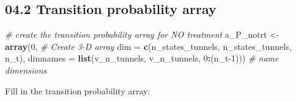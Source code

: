\documentclass[
]{article}
\newenvironment{Shaded}{\begin{snugshade}}{\end{snugshade}}
\newcommand{\CommentTok}[1]{\textcolor[rgb]{0.56,0.35,0.01}{\textit{#1}}}
\newcommand{\DataTypeTok}[1]{\textcolor[rgb]{0.13,0.29,0.53}{#1}}
\newcommand{\DecValTok}[1]{\textcolor[rgb]{0.00,0.00,0.81}{#1}}
\newcommand{\KeywordTok}[1]{\textcolor[rgb]{0.13,0.29,0.53}{\textbf{#1}}}
\newcommand{\NormalTok}[1]{#1}
\newcommand{\OperatorTok}[1]{\textcolor[rgb]{0.81,0.36,0.00}{\textbf{#1}}}
\newcommand{\StringTok}[1]{\textcolor[rgb]{0.31,0.60,0.02}{#1}}
\begin{document}
\hypertarget{transition-probability-array}{%
\subsection{04.2 Transition probability
array}\label{transition-probability-array}}

\begin{Shaded}
\begin{Highlighting}[]
\CommentTok{# create the transition probability array for NO treatment}
\NormalTok{a_P_notrt <-}\StringTok{ }\KeywordTok{array}\NormalTok{(}\DecValTok{0}\NormalTok{,                                          }\CommentTok{# Create 3-D array}
                   \DataTypeTok{dim =} \KeywordTok{c}\NormalTok{(n_states_tunnels, n_states_tunnels, n_t),}
                   \DataTypeTok{dimnames =} \KeywordTok{list}\NormalTok{(v_n_tunnels, v_n_tunnels, }\DecValTok{0}\OperatorTok{:}\NormalTok{(n_t}\DecValTok{-1}\NormalTok{))) }\CommentTok{# name dimensions}
\end{Highlighting}
\end{Shaded}

Fill in the transition probability array:
\end{document}
